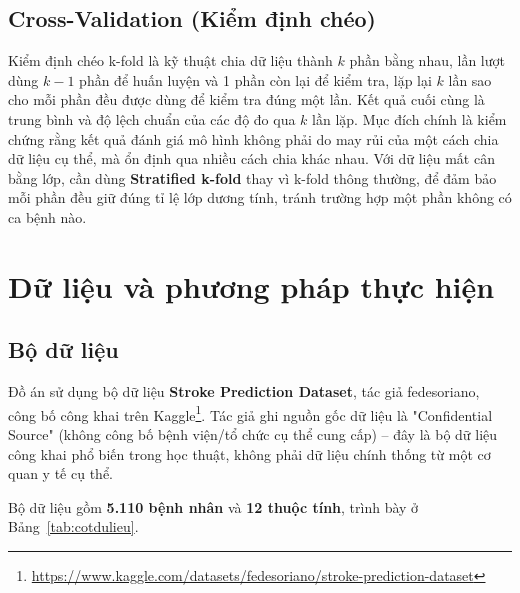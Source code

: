 \documentclass[12pt,a4paper]{report}
\begin{document}
\section{Cross-Validation (Kiểm định chéo)}

Kiểm định chéo k-fold là kỹ thuật chia dữ liệu thành $k$ phần bằng nhau, lần lượt dùng $k-1$ phần để huấn luyện và 1 phần còn lại để kiểm tra, lặp lại $k$ lần sao cho mỗi phần đều được dùng để kiểm tra đúng một lần. Kết quả cuối cùng là trung bình và độ lệch chuẩn của các độ đo qua $k$ lần lặp. Mục đích chính là kiểm chứng rằng kết quả đánh giá mô hình không phải do may rủi của một cách chia dữ liệu cụ thể, mà ổn định qua nhiều cách chia khác nhau. Với dữ liệu mất cân bằng lớp, cần dùng \textbf{Stratified k-fold} thay vì k-fold thông thường, để đảm bảo mỗi phần đều giữ đúng tỉ lệ lớp dương tính, tránh trường hợp một phần không có ca bệnh nào.

\chapter{Dữ liệu và phương pháp thực hiện}

\section{Bộ dữ liệu}

Đồ án sử dụng bộ dữ liệu \textbf{Stroke Prediction Dataset}, tác giả fedesoriano, công bố công khai trên Kaggle\footnote{\url{https://www.kaggle.com/datasets/fedesoriano/stroke-prediction-dataset}}. Tác giả ghi nguồn gốc dữ liệu là "Confidential Source" (không công bố bệnh viện/tổ chức cụ thể cung cấp) -- đây là bộ dữ liệu công khai phổ biến trong học thuật, không phải dữ liệu chính thống từ một cơ quan y tế cụ thể.

Bộ dữ liệu gồm \textbf{5.110 bệnh nhân} và \textbf{12 thuộc tính}, trình bày ở Bảng~\ref{tab:cotdulieu}.
\end{document}
